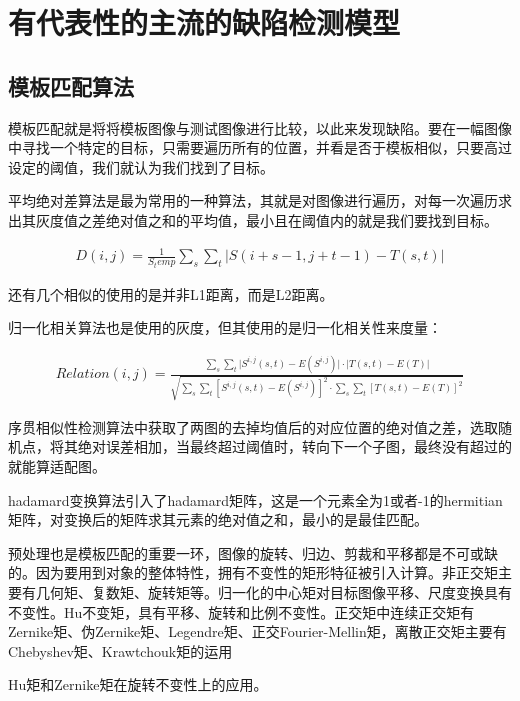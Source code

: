 \chapter{有代表性的主流的缺陷检测模型} 


\section{模板匹配算法}

模板匹配就是将将模板图像与测试图像进行比较，以此来发现缺陷。要在一幅图像中寻找一个特定的目标，只需要遍历所有的位置，并看是否于模板相似，只要高过设定的阈值，我们就认为我们找到了目标。

平均绝对差算法是最为常用的一种算法，其就是对图像进行遍历，对每一次遍历求出其灰度值之差绝对值之和的平均值，最小且在阈值内的就是我们要找到目标。

\begin{eqnarray}
    D(i,j) = \frac{1}{S_temp} \sum_{s} \sum_{t} \lvert S(i+s-1,j+t-1) - T(s,t) \rvert
\end{eqnarray}

还有几个相似的使用的是并非L1距离，而是L2距离。

归一化相关算法也是使用的灰度，但其使用的是归一化相关性来度量：

\begin{eqnarray}
    Relation(i,j) = \frac{\sum_s \sum_t \lvert S^{i,j}(s,t) -E(S^{i,j}) \rvert \cdot \lvert T(s,t) - E(T) \rvert}{\sqrt{\sum_s \sum_t [ S^{i,j}(s,t) -E(S^{i,j}) ] ^{2}   \cdot \sum_s \sum_t [ T(s,t) - E(T) ]^{2}}} 
\end{eqnarray}

序贯相似性检测算法中获取了两图的去掉均值后的对应位置的绝对值之差，选取随机点，将其绝对误差相加，当最终超过阈值时，转向下一个子图，最终没有超过的就能算适配图。

hadamard变换算法引入了hadamard矩阵，这是一个元素全为1或者-1的hermitian矩阵，对变换后的矩阵求其元素的绝对值之和，最小的是最佳匹配。

预处理也是模板匹配的重要一环，图像的旋转、归边、剪裁和平移都是不可或缺的。因为要用到对象的整体特性，拥有不变性的矩形特征被引入计算。非正交矩主要有几何矩、复数矩、旋转矩等。归一化的中心矩对目标图像平移、尺度变换具有不变性。Hu不变矩，具有平移、旋转和比例不变性。正交矩中连续正交矩有Zernike矩、伪Zernike矩、Legendre矩、正交Fourier-Mellin矩，离散正交矩主要有Chebyshev矩、Krawtchouk矩的运用

Hu矩和Zernike矩在旋转不变性上的应用。


